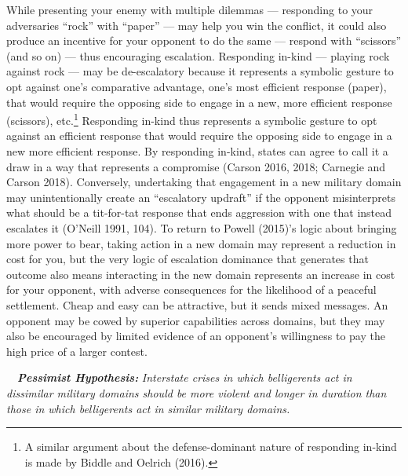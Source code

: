 \documentclass[
]{article}
\begin{document}
While presenting your enemy with multiple dilemmas --- responding to your adversaries ``rock'' with ``paper'' --- may help you win the conflict, it could also produce an incentive for your opponent to do the same --- respond with ``scissors'' (and so on) --- thus encouraging escalation. Responding in-kind --- playing rock against rock --- may be de-escalatory because it represents a symbolic gesture to opt against one's comparative advantage, one's most efficient response (paper), that would require the opposing side to engage in a new, more efficient response (scissors), etc.\footnote{A similar argument about the defense-dominant nature of responding in-kind is made by Biddle and Oelrich (2016).} Responding in-kind thus represents a symbolic gesture to opt against an efficient response that would require the opposing side to engage in a new more efficient response. By responding in-kind, states can agree to call it a draw in a way that represents a compromise (Carson 2016, 2018; Carnegie and Carson 2018). Conversely, undertaking that engagement in a new military domain may unintentionally create an ``escalatory updraft'' if the opponent misinterprets what should be a tit-for-tat response that ends aggression with one that instead escalates it (O'Neill 1991, 104). To return to Powell (2015)'s logic about bringing more power to bear, taking action in a new domain may represent a reduction in cost for you, but the very logic of escalation dominance that generates that outcome also means interacting in the new domain represents an increase in cost for your opponent, with adverse consequences for the likelihood of a peaceful settlement. Cheap and easy can be attractive, but it sends mixed messages. An opponent may be cowed by superior capabilities across domains, but they may also be encouraged by limited evidence of an opponent's willingness to pay the high price of a larger contest.

~~\textbf{\textit{Pessimist Hypothesis:}}\textit{ Interstate crises in which belligerents act in dissimilar military domains should be more violent and longer in duration than those in which belligerents act in similar military domains.}
\end{document}
